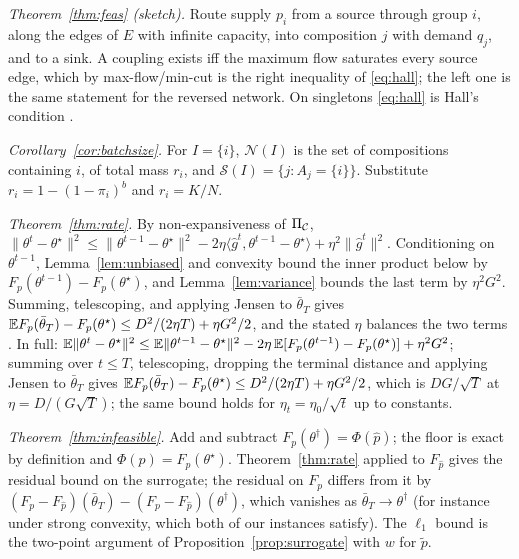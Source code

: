 \noindent\emph{Theorem~\ref{thm:feas} (sketch).} Route supply $p_i$ from a source through group $i$, along the edges of $E$
with infinite capacity, into composition $j$ with demand $q_j$, and to a sink.
A coupling exists iff the maximum flow saturates every source edge, which by
max-flow/min-cut \cite{fordfulkerson1956} is the right inequality of
\eqref{eq:hall}; the left one is the same statement for the reversed network.
On singletons \eqref{eq:hall} is Hall's condition \cite{hall1935}.

\noindent\emph{Corollary~\ref{cor:batchsize}.} For $I=\{i\}$, $\mathcal{N}(I)$ is the set of compositions containing $i$, of
total mass $r_i$, and $\mathcal{S}(I)=\{j:A_j=\{i\}\}$. Substitute
$r_i=1-(1-\pi_i)^b$ and $r_i=K/N$.

\noindent\emph{Theorem~\ref{thm:rate}.} By non-expansiveness of $\Pi_{\mathcal{C}}$,
$\|\theta^{t}-\theta^\star\|^2\le\|\theta^{t-1}-\theta^\star\|^2
-2\eta\langle\hat g^t,\theta^{t-1}-\theta^\star\rangle+\eta^2\|\hat g^t\|^2$.
Conditioning on $\theta^{t-1}$, Lemma~\ref{lem:unbiased} and convexity bound
the inner product below by $F_p(\theta^{t-1})-F_p(\theta^\star)$, and
Lemma~\ref{lem:variance} bounds the last term by $\eta^2G^2$. Summing,
telescoping, and applying Jensen to $\bar\theta_T$ gives
$\mathbb{E} F_p(\bar\theta_T)-F_p(\theta^\star)\le D^2/(2\eta T)+\eta G^2/2$, and the
stated $\eta$ balances the two terms \cite{nemirovski2009}.
In full: $\mathbb{E}\|\theta^{t}-\theta^\star\|^2\le\mathbb{E}\|\theta^{t-1}-\theta^\star\|^2-2\eta\,\mathbb{E}[F_p(\theta^{t-1})-F_p(\theta^\star)]+\eta^2G^2$;
summing over $t\le T$, telescoping, dropping the terminal distance and applying Jensen to $\bar\theta_T$ gives
$\mathbb{E} F_p(\bar\theta_T)-F_p(\theta^\star)\le D^2/(2\eta T)+\eta G^2/2$, which is $DG/\sqrt{T}$ at $\eta=D/(G\sqrt{T})$;
the same bound holds for $\eta_t=\eta_0/\sqrt{t}$ up to constants.

\noindent\emph{Theorem~\ref{thm:infeasible}.} Add and subtract $F_p(\theta^\dagger)=\Phi(\hat p)$; the floor is exact by
definition and $\Phi(p)=F_p(\theta^\star)$. Theorem~\ref{thm:rate} applied to
$F_{\hat p}$ gives the residual bound on the surrogate; the residual on $F_p$
differs from it by $(F_p-F_{\hat p})(\bar\theta_T)-(F_p-F_{\hat p})(\theta^\dagger)$,
which vanishes as $\bar\theta_T\to\theta^\dagger$ (for instance under strong
convexity, which both of our instances satisfy). The $\ell_1$ bound is the
two-point argument of Proposition~\ref{prop:surrogate} with $w$ for $\tilde p$.

